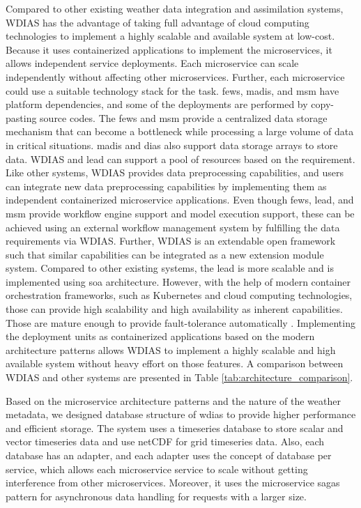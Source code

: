 Compared to other existing weather data integration and assimilation systems, WDIAS has the advantage of taking full advantage of cloud computing technologies to implement a highly scalable and available system at low-cost. Because it uses containerized applications to implement the microservices, it allows independent service deployments. Each microservice can scale independently without affecting other microservices. Further, each microservice could use a suitable technology stack for the task. \acrshort{fews}, \acrshort{madis}, and \acrshort{msm} have platform dependencies, and some of the deployments are performed by copy-pasting source codes. The \acrshort{fews} and \acrshort{msm} provide a centralized data storage mechanism that  can become a bottleneck while processing a large volume of data in critical situations. \acrshort{madis} and \acrshort{dias} also support data storage arrays to store data. WDIAS and \acrshort{lead} can support a pool of resources based on the requirement.
Like other systems, WDIAS provides data preprocessing capabilities, and users can integrate new data preprocessing capabilities by implementing them as independent containerized microservice applications. Even though \acrshort{fews}, \acrshort{lead}, and \acrshort{msm} provide workflow engine support and model execution support, these can be achieved using an external workflow management system by fulfilling the data requirements via WDIAS. Further, WDIAS is an extendable open framework such that similar capabilities can be integrated as a new extension module system. Compared to other existing systems, the \acrshort{lead} is more scalable and is implemented using \acrshort{soa} architecture. However, with the help of modern container orchestration frameworks, such as Kubernetes and cloud computing technologies, those can provide high scalability and high availability as inherent capabilities. Those are mature enough to provide fault-tolerance automatically \cite{Scolati2019ADevices}. Implementing the deployment units as containerized applications based on the modern architecture patterns allows WDIAS to implement a highly scalable and high available system without heavy effort on those features.  A comparison  between WDIAS and other systems are presented in Table \ref{tab:architecture_comparison}.

Based on the microservice architecture patterns and the nature of the weather metadata, we designed database structure of \acrshort{wdias} to provide higher performance and efficient storage. The system uses a timeseries database to store scalar and vector timeseries data and use netCDF for grid timeseries data. Also, each database has an adapter, and each adapter uses the concept of database per service, which allows each microservice service to scale without getting interference from other microservices.
Moreover, it uses the microservice sagas pattern for asynchronous data handling for requests with a larger size.

